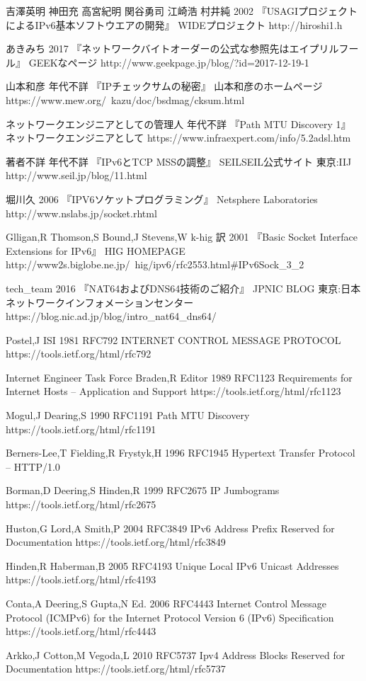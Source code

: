\begin{thebibliography}{99}
\item
	吉澤英明 神田充 高宮紀明 関谷勇司 江崎浩 村井純
	2002
	『USAGIプロジェクトによるIPv6基本ソフトウエアの開発』
	WIDEプロジェクト
	http://hiroshi1.h
\item
    あきみち
    2017
    『ネットワークバイトオーダーの公式な参照先はエイプリルフール』
    GEEKなページ
    http://www.geekpage.jp/blog/?id=2017-12-19-1
\item
    山本和彦
    年代不詳
    『IPチェックサムの秘密』
    山本和彦のホームページ
    https://www.mew.org/~kazu/doc/bsdmag/cksum.html
\item
    ネットワークエンジニアとしての管理人
    年代不詳
    『Path MTU Discovery 1』
    ネットワークエンジニアとして
    https://www.infraexpert.com/info/5.2adsl.htm
\item
    著者不詳
    年代不詳
    『IPv6とTCP MSSの調整』
    SEILSEIL公式サイト
    東京:IIJ
    http://www.seil.jp/blog/11.html
\item
    堀川久
    2006
    『IPV6ソケットプログラミング』
    Netsphere Laboratories
    http://www.nslabs.jp/socket.rhtml
\item
    Glligan,R Thomson,S Bound,J Stevens,W
    k-hig 訳
    2001
    『Basic Socket Interface Extensions for IPv6』
    HIG HOMEPAGE
    http://www2s.biglobe.ne.jp/~hig/ipv6/rfc2553.html\#IPv6Sock\_3\_2
\item
    tech\_team
    2016
    『NAT64およびDNS64技術のご紹介』
    JPNIC BLOG
    東京:日本ネットワークインフォメーションセンター
    https://blog.nic.ad.jp/blog/intro\_nat64\_dns64/
\item
	Postel,J ISI
	1981
	RFC792 INTERNET CONTROL MESSAGE PROTOCOL
	https://tools.ietf.org/html/rfc792
\item
    Internet Engineer Task Force 
    Braden,R Editor
    1989
    RFC1123 Requirements for Internet Hosts -- Application and Support
    https://tools.ietf.org/html/rfc1123 
\item
    Mogul,J Dearing,S
    1990
    RFC1191 Path MTU Discovery
    https://tools.ietf.org/html/rfc1191
\item
    Berners-Lee,T Fielding,R Frystyk,H
    1996
    RFC1945 Hypertext Transfer Protocol -- HTTP/1.0
\item
	Borman,D Deering,S Hinden,R
	1999
	 RFC2675 IP Jumbograms
	 https://tools.ietf.org/html/rfc2675
\item
    Huston,G Lord,A Smith,P
    2004
    RFC3849 IPv6 Address Prefix Reserved for Documentation
    https://tools.ietf.org/html/rfc3849
\item
    Hinden,R Haberman,B
    2005
    RFC4193 Unique Local IPv6 Unicast Addresses
    https://tools.ietf.org/html/rfc4193
\item
	Conta,A Deering,S 
	Gupta,N Ed.
	2006
	RFC4443 Internet Control Message Protocol (ICMPv6) for the Internet Protocol Version 6 (IPv6) Specification
	https://tools.ietf.org/html/rfc4443
\item
    Arkko,J Cotton,M Vegoda,L
    2010
    RFC5737 Ipv4 Address Blocks Reserved for Documentation
    https://tools.ietf.org/html/rfc5737
\end{thebibliography}